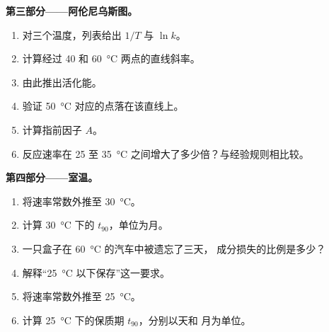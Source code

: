 \begin{problem}
\medskip
\noindent\textbf{第三部分——阿伦尼乌斯图。}
\begin{enumerate}[resume]
  \item 对三个温度，列表给出 $1/T$ 与 $\ln k$。
  \item 计算经过 40 和
        \qty{60}{\celsius} 两点的直线斜率。
  \item 由此推出活化能。
  \item 验证 \qty{50}{\celsius} 对应的点落在该直线上。
  \item 计算指前因子 $A$。
  \item 反应速率在 25 至
        \qty{35}{\celsius} 之间增大了多少倍？与经验规则相比较。
\end{enumerate}

\medskip
\noindent\textbf{第四部分——室温。}
\begin{enumerate}[resume]
  \item 将速率常数外推至 \qty{30}{\celsius}。
  \item 计算 \qty{30}{\celsius} 下的 $t_{90}$，单位为月。
  \item 一只盒子在 \qty{60}{\celsius} 的汽车中被遗忘了三天，
        成分损失的比例是多少？
  \item 解释“\qty{25}{\celsius} 以下保存”这一要求。
  \item 将速率常数外推至 \qty{25}{\celsius}。
  \item 计算 \qty{25}{\celsius} 下的保质期 $t_{90}$，分别以天和
        月为单位。
\end{enumerate}
\end{problem}
